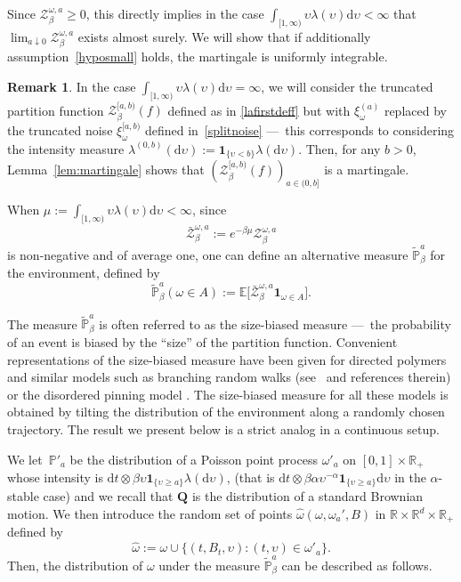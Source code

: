 \documentclass[JEP,XML,SOM,Unicode,published]{cedram}
\let\mathcal\mathscr
\let\sep:
\theoremstyle{definition}
\newtheorem{rem}[theorem]{Remark}
\newcommand{\dd}{\mathrm{d}}
\newcommand{\ind}{\mathbf{1}}
\newcommand{\cZ}{{\ensuremath{\mathcal Z}} }
\newcommand{\bQ}{{\ensuremath{\mathbf Q}} }
\newcommand{\bbE}{{\ensuremath{\mathbb E}} }
\newcommand{\bbP}{{\ensuremath{\mathbb P}} }
\newcommand{\bbR}{{\ensuremath{\mathbb R}} }
\let\gb\beta
\let\gl\lambda
\let\ups\upsilon
\let\go\omega
\begin{document}
Since $\cZ_{\gb}^{\go,a}\geq 0$, this directly implies
in the case $\int_{[1,\infty)} \ups \gl(\ups)\dd \ups<\infty$ that $\lim_{a\downarrow 0}\cZ^{\go,a}_{\beta}$ exists almost surely.
We will show that if additionally assumption~\eqref{hyposmall} holds,
the martingale is uniformly integrable.

\begin{rem}
In the case $\int_{[1,\infty)} \ups \gl(\ups)\dd \ups=\infty$,
we will consider the
truncated partition function
$\cZ_{\gb}^{[a,b)}(f)$ defined as in \eqref{lafirstdeff} but with $\xi_{\go}^{(a)}$ replaced by the truncated noise $\xi_{\go}^{[a,b)}$ defined in~\eqref{splitnoise} ---~this corresponds to considering
the intensity measure $\lambda^{(0,b)} (\dd \ups) := \ind_{\{\ups < b\}} \lambda(\dd \ups)$.
Then, for any $b>0$, Lemma~\ref{lem:martingale} shows that $(\cZ_{\gb}^{[a,b)}(f))_{a\in (0,b]}$ is a martingale.
\end{rem}

When $\mu:=\int_{[1,\infty)} \ups \gl(\ups)\dd \ups<\infty$, since
\[
\bar \cZ^{\go,a}_{\beta}:= e^{-\beta \mu} \cZ_{\gb}^{\go,a}
\]
is non-negative and of average one, one can define
an alternative measure $\tilde \bbP^a_{\beta}$ for the environment, defined by
\begin{equation}
\label{tildemeasure}
\tilde \bbP^a_{\beta}(\go\in A):= \bbE\bigl[ \bar \cZ_{\gb}^{\go,a} \ind_{\go\in A}\bigr].
\end{equation}

The measure $\tilde \bbP^a_{\beta}$ is often referred to as the size-biased measure
---~the probability of an event is biased by the ``size'' of the partition function.
Convenient representations of the size-biased measure have been given for directed polymers \cite[Lem.\,1]{Bir04} and similar models such as branching random walks (see~\cite[Ch.\,4]{ShiBRW} and references therein) or the disordered pinning model \cite[\S5.2]{LS17}.
The size-biased measure for all these models is obtained by tilting the distribution
of the environment along a randomly chosen trajectory.
The result we present below is a strict analog in a continuous setup.

We let~$\bbP'_a$ be the distribution of a Poisson point process $\go'_a$ on $[0,1]\times\bbR_+$ whose intensity is $\dd t \otimes \beta \ups \ind_{\{\ups \geq a\}}\gl(\dd \ups)$, (that is $\dd t \otimes \beta\alpha \ups^{-\alpha}\ind_{\{\ups \geq a\}} \dd \ups$ in the $\alpha$-stable case)
and we recall that $\bQ$ is the distribution
of a standard Brownian motion.
We then introduce the random set of points $\hat \go(\go, \go_a',B)$ in $\bbR\times \bbR^{d}\times \bbR_+$ defined by
\begin{equation}
\label{def:hatomega}
\hat \go:= \go \cup \bigl\{ (t,B_t,\ups) \sep (t,\ups)\in \go'_a \bigr\}.
\end{equation}
Then, the distribution of $\omega$ under the measure $\tilde \bbP^a_{\beta}$ can be described as follows.
\end{document}
